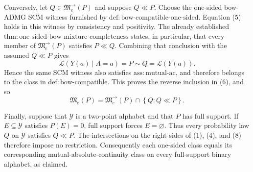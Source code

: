 Conversely, let \(Q\in\mathfrak M^{\to}_e(P)\) and suppose \(Q\ll P\).  Choose the one-sided bow-ADMG SCM witness furnished by \(\mathrm{def:bow\text{-}compatible\text{-}one\text{-}sided}\).  Equation (5) holds in this witness by consistency and positivity.  The already established \(\mathrm{thm:one\text{-}sided\text{-}bow\text{-}mixture\text{-}completeness}\) states, in particular, that every member of \(\mathfrak M^{\to}_e(P)\) satisfies \(P\ll Q\).  Combining that conclusion with the assumed \(Q\ll P\) gives
\[
\mathcal L(Y(a)\mid A=a)=P\sim Q=\mathcal L(Y(a)).
\tag{7}
\]
Hence the same SCM witness also satisfies \(\mathrm{ass:mutual\text{-}ac}\), and therefore belongs to the class in \(\mathrm{def:bow\text{-}compatible}\).  This proves the reverse inclusion in (6), and so
\[
\mathfrak M_e(P)
=\mathfrak M^{\to}_e(P)\cap\left\{Q:Q\ll P\right\}.
\tag{8}
\]

Finally, suppose that \(\mathcal Y\) is a two-point alphabet and that \(P\) has full support.  If \(E\subseteq\mathcal Y\) satisfies \(P(E)=0\), full support forces \(E=\varnothing\).  Thus every probability law \(Q\) on \(\mathcal Y\) satisfies \(Q\ll P\).  The intersections on the right sides of (1), (4), and (8) therefore impose no restriction.  Consequently each one-sided class equals its corresponding mutual-absolute-continuity class on every full-support binary alphabet, as claimed.